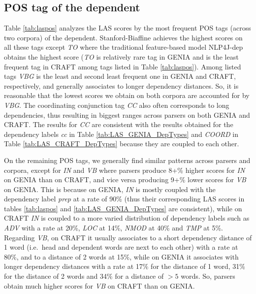 \documentclass[twocolumn,hyperref]{bmcart}\pdfoutput=1
\begin{document}
\subsection*{POS tag of the dependent}

Table \ref{tab:laspos} analyzes the LAS scores by the most frequent POS tags (across two corpora) of the dependent. Stanford-Biaffine achieves the highest scores on all these tags except \textit{TO} where the traditional feature-based model NLP4J-dep obtains the highest score (\textit{TO} is relatively rare tag in GENIA and is the least frequent tag in CRAFT among  tags listed in Table \ref{tab:laspos}). Among listed tags \textit{VBG} is the least and second least frequent one in GENIA and CRAFT, respectively, and generally associates to longer dependency distances. So, it is reasonable that the lowest scores we obtain on both corpora are accounted for by \textit{VBG}. The coordinating conjunction tag \textit{CC} also often corresponds to long  dependencies,  thus resulting in biggest ranges across parsers on both GENIA and CRAFT. The results for \textit{CC}  are
consistent with the results obtained for the dependency labels  \textit{cc} in 
 Table \ref{tab:LAS_GENIA_DepTypes} and   \textit{COORD}  in Table  \ref{tab:LAS_CRAFT_DepTypes} because they are coupled to each other. 
 
 
On the remaining POS tags, we generally find similar patterns across parsers and corpora, except for  \textit{IN} and \textit{VB} where  parsers produce 8+\% higher scores for \textit{IN} on GENIA than on CRAFT, and vice versa producing 9+\% lower scores for \textit{VB} on GENIA.  
This is because on GENIA,   \textit{IN} is  mostly coupled with the dependency label \textit{prep} at a rate  of 90\%  (thus their corresponding LAS  scores in tables \ref{tab:laspos}   and \ref{tab:LAS_GENIA_DepTypes} are consistent), while on CRAFT \textit{IN} is  coupled to a more varied distribution of dependency labels such as \textit{ADV} with a  rate at 20\%, \textit{LOC} at 14\%, \textit{NMOD} at 40\% and \textit{TMP} at 5\%.  Regarding \textit{VB},  on CRAFT it usually associates to a short dependency distance of 1 word (i.e.\ head and dependent words are next to each other) with a rate at 80\%, and to a distance of 2 words at  15\%, while on GENIA it associates with longer dependency distances with a rate at 17\% for the distance of 1 word, 31\% for the distance of 2 words and 34\% for a distance of $>5$ words. So, parsers obtain much higher scores for \textit{VB} on CRAFT than on GENIA.  
\end{document}
